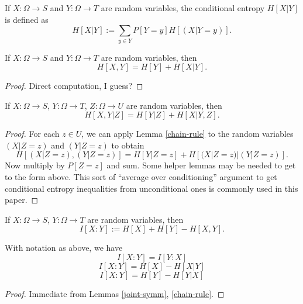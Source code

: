 \begin{definition}\label{conditional-entropy-def}
    If $X: \Omega \to S$ and $Y: \Omega \to T$ are random variables, the conditional entropy $H[X|Y]$ is defined as
  $$ H[X|Y] := \sum_{y \in Y} P[Y = y] H[(X | Y=y)].$$
\end{definition}

\begin{lemma}\label{chain-rule}
   
  If $X: \Omega \to S$ and $Y: \Omega \to T$ are random variables, then
  $$ H[ X,Y  ] = H[Y] + H[X|Y].$$
\end{lemma}

\begin{proof} Direct computation, I guess?
\end{proof}

\begin{lemma}\label{conditional-chain-rule} 
  If $X: \Omega \to S$, $Y: \Omega \to T$, $Z: \Omega \to U$ are random variables, then
$$ H[  X,Y | Z ] = H[Y | Z] + H[X|Y, Z].$$
\end{lemma}

\begin{proof}  For each $z \in U$, we can apply Lemma \ref{chain-rule} to the random variables $(X|Z=z)$ and $(Y|Z=z)$ to obtain
$$ H[ (X|Z=z),(Y|Z=z) ] = H[Y|Z=z] + H[(X|Z=z)|(Y|Z=z)].$$
Now multiply by $P[Z=z]$ and sum.  Some helper lemmas may be needed to get to the form above.  This sort of ``average over conditioning'' argument to get conditional entropy inequalities from unconditional ones is commonly used in this paper.
\end{proof}

\begin{definition}\label{information-def} If $X: \Omega \to S$, $Y: \Omega \to T$ are random variables, then
  $$ I[ X : Y ] := H[X] + H[Y] - H[X,Y].$$
\end{definition}

\begin{lemma}\label{alternative-mutual}
    
  With notation as above, we have
$$  I[X : Y] = I[Y:X]$$
$$  I[X : Y] = H[X] - H[X|Y]$$
$$  I[X : Y] = H[Y] - H[Y|X]$$
\end{lemma}

\begin{proof} Immediate from Lemmas \ref{joint-symm}, \ref{chain-rule}.
\end{proof}

